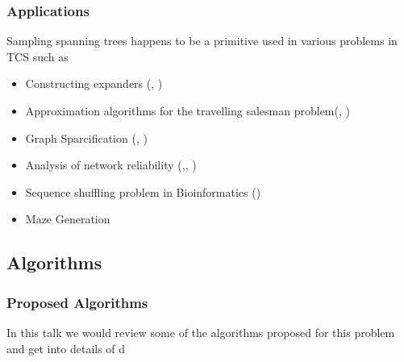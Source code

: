\documentclass{beamer}
\begin{document}
\begin{frame}

\frametitle{Applications}
 
Sampling spanning trees happens to be a primitive used in various problems in TCS such as 

\begin{itemize}
\pause
\item Constructing expanders (\cite{10.5555/1496770.1496834}, \cite{doi:10.1137/120890971})
\pause
\item Approximation algorithms for the travelling salesman problem(\cite{6108216}, \cite{doi:10.1287/opre.2017.1603})
\pause
\item Graph Sparcification (\cite{DBLP:journals/corr/abs-1005-0265}, \cite{dolev2016random})
\pause
\item Analysis of network reliability (\cite{10.5555/535891},\cite{doi:10.1002/net.3230200303}, \cite{colbourn1988estimating})
\pause
\item Sequence shuffling problem in Bioinformatics (\cite{KANDEL1996171})
\pause
\item Maze Generation
\end{itemize}
% 



\end{frame}


\subsection{Algorithms}
\begin{frame}
 \frametitle{Proposed Algorithms}
 
 In this talk we would review some of the algorithms proposed for this problem and get into details of \cite{harvey2016generating}d
 
\end{frame}


\begin{frame}
\centering
\end{frame}
\end{document}
